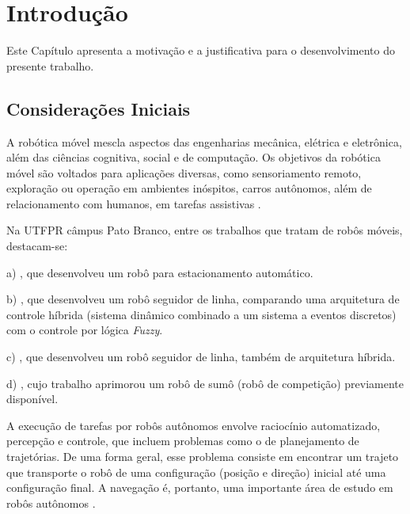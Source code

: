 \chapter{Introdução}
\vspace{-2.5 cm}


Este Capítulo apresenta a motivação e a justificativa para o desenvolvimento do
presente trabalho.

\section{Considerações Iniciais} 

A robótica móvel mescla aspectos das engenharias mecânica, elétrica e
eletrônica, além das ciências cognitiva, social e de computação. Os objetivos da
robótica móvel são voltados para aplicações diversas, como sensoriamento remoto,
exploração ou operação em ambientes inóspitos, carros autônomos, além de
relacionamento com humanos, em tarefas assistivas \cite{Livro_Siegwart}.

Na UTFPR câmpus Pato Branco, entre os trabalhos que tratam de robôs móveis,
destacam-se: 

a) , que desenvolveu um robô para estacionamento
automático.

b) , que desenvolveu um robô seguidor de linha,
comparando uma arquitetura de controle híbrida (sistema dinâmico combinado a um
sistema a eventos discretos) com o controle por lógica \textit{Fuzzy}.

c) , que desenvolveu um robô seguidor de linha, também de
arquitetura híbrida.

d) , cujo trabalho aprimorou um robô de
sumô (robô de competição) previamente disponível. 

A execução de tarefas por robôs autônomos envolve raciocínio automatizado,
percepção e controle, que incluem problemas como o de planejamento de
trajetórias. De uma forma geral, esse problema consiste em encontrar um
trajeto que transporte o robô de uma configuração (posição e direção)
inicial até uma configuração final. A navegação é, portanto, uma importante área
de estudo em robôs autônomos \cite{mest_marchi, mest_neto, Tcc_Ottoni}.

